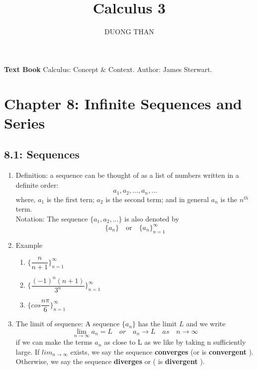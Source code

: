 \documentclass[12pt]{amsart}
\author{DUONG THAN}
\title{Calculus 3 }
\begin{document}
\maketitle
\large

\textbf{Text Book} Calculus: Concept $\&$ Context. Author: James Sterwart. \\

\section{Chapter 8: Infinite Sequences and Series}

\subsection{8.1: Sequences}

\begin{enumerate}

	\item Definition: a sequence can be thought of as a list of numbers written in a definite order: 
	\[
	a_1,a_2,\dots,a_n,\dots
	\]
	where, $a_1$ is the first tern; $a_2$ is the second term; and in general $a_n$ is the $n^{th}$ term. \\
	Notation: The sequence $\{ a_1, a_2,\dots\}$ is also denoted by 
	\[
	\{a_n\} \quad \text{or} \quad \{a_n\}_{n=1}^{\infty}
	\]
 	\item Example
		\begin{enumerate}
			\item $\Big\{\dfrac{n}{n+1} \Big\}_{n=1}^{\infty}$
			
			\vspace{2in}
			
			\item $\Big\{\dfrac{(-1)^n(n+1)}{3^n} \Big\}_{n=1}^{\infty}$
			
			\vspace{2in}
			
			\item $\Big\{cos\dfrac{n\pi}{6}\Big\}_{n=1}^{\infty}$
		
		\end{enumerate}
		
		\vspace{4in}
		
	\item The limit of sequence: A sequence $\{ a_n\}$ has the limit $L$ and we write 
	\[
	\lim_{n \to \infty} a_n = L \quad or \quad a_n \to L \quad as \quad n \to \infty
	\] 
	 if we can make the terms $a_n$ as close to L as we like by taking n sufficiently large. If $lim_{n \to \infty}$ exists, we say the sequence \textbf{converges} (or is \textbf{convergent
	 }). Otherwise, we say the sequence \textbf{diverges} or ( is \textbf{divergent} ).
	

\end{enumerate}
\end{document}

